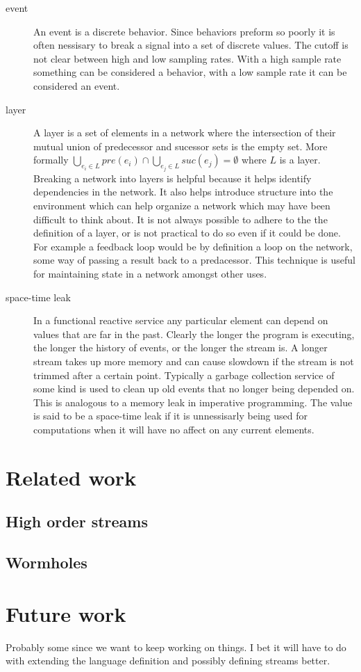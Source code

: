 \documentclass[twocolumn]{paper}
\begin{document}
\begin{description}
\item[event] An event is a discrete behavior. Since behaviors preform so poorly it is often nessisary to break a signal into a set of discrete values. The cutoff is not clear between high and low sampling rates. With a high sample rate something can be considered a behavior, with a low sample rate it can be considered an event.

\item[layer] A layer is a set of elements in a network where the intersection of their mutual union of predecessor and sucessor sets is the empty set. More formally $\bigcup_{e_i \in L}{pre(e_i)} \cap \bigcup_{e_j \in L}{suc(e_j)} = \emptyset$ where $L$ is a layer. Breaking a network into layers is helpful because it helps identify dependencies in the network. It also helps introduce structure into the environment which can help organize a network which may have been difficult to think about. It is not always possible to adhere to the the definition of a layer, or is not practical to do so even if it could be done. For example a feedback loop would be by definition a loop on the network, some way of passing a result back to a predacessor. This technique is useful for maintaining state in a network amongst other uses.


\item[space-time leak] In a functional reactive service any particular element can depend on values that are far in the past. Clearly the longer the program is executing, the longer the history of events, or the longer the stream is. A longer stream takes up more memory and can cause slowdown if the stream is not trimmed after a certain point. Typically a garbage collection service of some kind is used to clean up old events that no longer being depended on. This is analogous to a memory leak in imperative programming. The value is said to be a space-time leak if it is unnessisarly being used for computations when it will have no affect on any current elements.
\end{description}
\section{Related work}
\subsection{High order streams}
\cite{HighOrderStreams}
\subsection{Wormholes}
\cite{WinogradCort2012HS}
\section{Future work}
Probably some since we want to keep working on things. I bet it will have to do with extending the language definition and possibly defining streams better.




\end{document}
